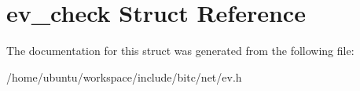 \hypertarget{structev__check}{\section{ev\-\_\-check Struct Reference}
\label{structev__check}
}


The documentation for this struct was generated from the following file\-:\begin{DoxyCompactItemize}
\item 
/home/ubuntu/workspace/include/bitc/net/ev.\-h\end{DoxyCompactItemize}
